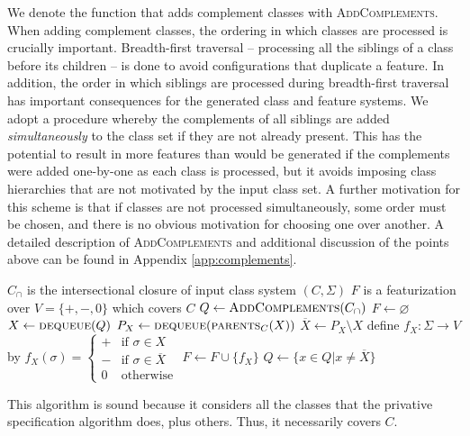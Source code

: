 \documentclass[12pt, oneside]{article}   	%
\begin{document}
We denote the function that adds complement classes with \textsc{AddComplements}. When adding complement classes, the ordering in which classes are processed is crucially important. Breadth-first traversal -- processing all the siblings of a class before its children -- is done to avoid configurations that duplicate a feature. In addition, the order in which siblings are processed during breadth-first traversal has important consequences for the generated class and feature systems. We adopt a procedure whereby the complements of all siblings are added \textit{simultaneously} to the class set if they are not already present. This has the potential to result in more features than would be generated if the complements were added one-by-one as each class is processed, but it avoids imposing class hierarchies that are not motivated by the input class set. A further motivation for this scheme is that if classes are not processed simultaneously, some order must be chosen, and there is no obvious motivation for choosing one over another. A detailed description of \textsc{AddComplements} and additional discussion of the points above can be found in Appendix \ref{app:complements}.
\noindent \begin{algorithmic}
	\singlespacing
    \REQUIRE $C_\cap$ is the intersectional closure of input class system $(C, \Sigma)$
    \ENSURE $F$ is a featurization over $V = \{ +, -, 0 \}$ which covers $C$
    \STATE
    \STATE $Q \leftarrow \textsc{AddComplements}(C_\cap)$
    \STATE $F \leftarrow \varnothing$
    \STATE
        \STATE $X \leftarrow \textsc{dequeue}(Q)$
            \STATE $P_X \leftarrow \textsc{dequeue}(\textsc{parents}_C(X))$
            \STATE $\overline{X} \leftarrow P_X \setminus X$
            \STATE define $f_X : \Sigma \rightarrow V$ by $f_X (\sigma) = \begin{cases}
                    + & \text{if } \sigma \in X \\
                    - & \text{if } \sigma \in \overline{X} \\
                    0 & \text{otherwise}
                    \end{cases}$
            \STATE $F \leftarrow F \cup \{f_X\}$
            \STATE $Q \leftarrow \{x \in Q \vert x \neq \overline{X} \}$
        \ENDIF
    \ENDWHILE
\end{algorithmic}
\doublespacing

\noindent This algorithm is sound because it considers all the classes that the privative specification algorithm does, plus others. Thus, it necessarily covers $C$.
\end{document}
